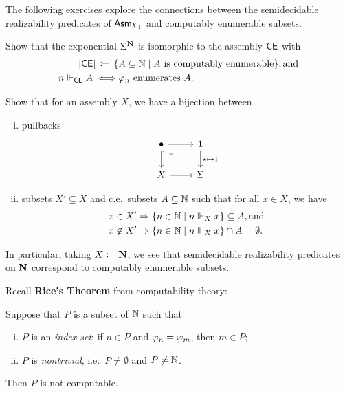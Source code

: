 The following exercises explore the connections between the semidecidable
realizability predicates of \(\mathsf{Asm}_{\mathcal{K}_1}\) and computably enumerable subsets.

\begin{exercise}\label{exer:Sigma-to-N-is-CE}
  Show that the exponential \(\Sigma^\mathbf N\) is isomorphic to the assembly
  \(\mathsf{CE}\) with
  \begin{align*}
    \lvert\mathsf{CE}\rvert \,\coloneqq\, \{&A \subseteq \mathbb N \mid A \text{ is computably enumerable}\}, \text{and} \\
    n \Vdash_{\mathsf{CE}} A \iff &\varphi_{n} \text{ enumerates } A.
  \end{align*}
\end{exercise}

\begin{exercise}\label{exer:Sigma-ce-subsets}
  Show that for an assembly \(X\), we have a bijection between
  \begin{enumerate}[(i)]
  \item pullbacks
    \[
      \begin{tikzcd}
        \bullet \pbcorner \ar[r] \ar[d,hookrightarrow]
        & \One \ar[d,"\star \mapsto 1"] \\
        X \ar[r] & \Sigma
      \end{tikzcd}
    \]
  \item subsets \(X' \subseteq X\) and c.e.\ subsets
    \(A \subseteq \mathbb N\) such that for all \(x \in X\), we have
    \begin{align*}
      x \in X' &\Rightarrow \{n \in \mathbb N \mid n \Vdash_X x\} \subseteq A, \text{and} \\
      x \not\in X' &\Rightarrow \{n \in \mathbb N \mid n \Vdash_X x\} \cap A = \emptyset.
    \end{align*}
  \end{enumerate}
  In particular, taking \(X \coloneqq \mathbf N\), we see that semidecidable
  realizability predicates on \(\mathbf N\) correspond to computably
  enumerable subsets.
\end{exercise}

Recall \textbf{Rice's Theorem} from computability theory:

%
\begin{theorem*}[Rice]
  Suppose that \(P\) is a subset of\/ \(\mathbb N\) such that
  \begin{enumerate}[(i)]
  \item \(P\) is an \emph{index set}: if \(n \in P\) and \(\varphi_{n} = \varphi_{m}\), then \(m \in P\);
  \item \(P\) is \emph{nontrivial}, i.e.\ \(P \neq \emptyset\) and \(P \neq \mathbb N\).
  \end{enumerate}
  Then \(P\) is not computable.
\end{theorem*}


